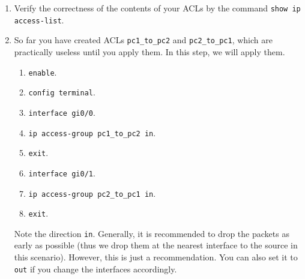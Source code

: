 \documentclass[pdftex,12pt,a4paper]{article}
\begin{document}
\begin{enumerate}
                    \item Verify the correctness of the contents of your ACLs by
                        the command \texttt{show ip access-list}.

                    \item So far you have created ACLs \texttt{pc1\_to\_pc2}
                        and \texttt{pc2\_to\_pc1}, which are practically
                        useless until you apply them. In this step, we will
                        apply them.

                        \begin{enumerate}
                            \item \texttt{enable}.
                            \item \texttt{config terminal}.
                            \item \texttt{interface gi0/0}.
                            \item \texttt{ip access-group pc1\_to\_pc2 in}.
                            \item \texttt{exit}.
                            \item \texttt{interface gi0/1}.
                            \item \texttt{ip access-group pc2\_to\_pc1 in}.
                            \item \texttt{exit}.
                        \end{enumerate}

                        Note the direction \texttt{in}. Generally, it is
                        recommended to drop the packets as early as possible
                        (thus we drop them at the nearest interface to the
                        source in this scenario). However, this is just a
                        recommendation. You can also set it to \texttt{out} if
                        you change the interfaces accordingly.
                \end{enumerate}
\end{document}
